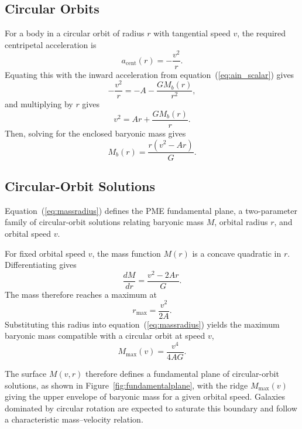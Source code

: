 \documentclass[fontsize=12pt, paper=a4]{scrartcl}
\begin{document}
\subsection{Circular Orbits}

For a body in a circular orbit of radius $r$ with tangential speed $v$, the required centripetal acceleration is
\begin{equation}
a_{\mathrm{cent}}(r) = -\frac{v^2}{r} .
\end{equation}
Equating this with the inward acceleration from equation~(\ref{eq:ain_scalar}) gives
\begin{equation}
-\frac{v^2}{r} = -A - \frac{G M_b(r)}{r^2} ,
\end{equation}
and multiplying by $r$ gives
\begin{equation}
v^2 = A r + \frac{G M_b(r)}{r} .
\end{equation}
Then, solving for the enclosed baryonic mass gives
\begin{equation}
M_b(r) = \frac{r\left(v^2 - A r\right)}{G}.
\label{eq:massradius}
\end{equation}

\subsection{Circular-Orbit Solutions}

Equation~(\ref{eq:massradius}) defines the PME fundamental plane, a two-parameter family of circular-orbit solutions relating baryonic mass $M$, orbital radius $r$, and orbital speed $v$.

For fixed orbital speed $v$, the mass function $M(r)$ is a concave quadratic in $r$. Differentiating gives
\begin{equation}
\frac{dM}{dr} = \frac{v^2 - 2 A r}{G} .
\end{equation}
The mass therefore reaches a maximum at
\begin{equation}
r_{\max} = \frac{v^2}{2A} .
\end{equation}
Substituting this radius into equation~(\ref{eq:massradius}) yields the maximum baryonic mass compatible with a circular orbit at speed $v$,
\begin{equation}
M_{\max}(v) = \frac{v^4}{4 A G}.
\label{eq:btfr_envelope}
\end{equation}

The surface $M(v,r)$ therefore defines a fundamental plane of circular-orbit solutions, as shown in Figure~\ref{fig:fundamentalplane}, with the ridge $M_{\max}(v)$ giving the upper envelope of baryonic mass for a given orbital speed. Galaxies dominated by circular rotation are expected to saturate this boundary and follow a characteristic mass--velocity relation.
\end{document}
